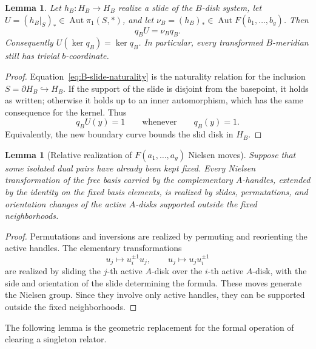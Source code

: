 \documentclass{article}
\newtheorem{lm}[theorem]{Lemma}
\DeclareMathOperator{\Aut}{Aut}
\begin{document}
\begin{lm}
\label{lem:B-slide-preserves-kernel}
Let \(h_B:H_B\to H_B\) realize a slide of the \(B\)-disk system, let
\(U=(h_B|_S)_*\in\Aut\pi_1(S,*)\), and let
\(\nu_B=(h_B)_*\in\Aut F(b_1,\ldots,b_g)\).  Then
\begin{equation}
 q_B U=\nu_B q_B.
 \label{eq:B-slide-naturality}
\end{equation}
Consequently \(U(\ker q_B)=\ker q_B\).  In particular, every transformed
\(B\)-meridian still has trivial \(b\)-coordinate.
\end{lm}

\begin{proof}
Equation~\eqref{eq:B-slide-naturality} is the naturality relation for the
inclusion \(S=\partial H_B\hookrightarrow H_B\).  If the support of the slide
is disjoint from the basepoint, it holds as written; otherwise it holds up to
an inner automorphism, which has the same consequence for the kernel.  Thus
\[
 q_B U(y)=1
 \qquad\text{whenever}\qquad q_B(y)=1.
\]
Equivalently, the new boundary curve bounds the slid disk in \(H_B\).
\end{proof}

\begin{lm}[Relative realization of $F(a_1,\ldots ,a_g)$  Nielsen moves]
\label{lem:relative-nielsen-realization}
Suppose that some isolated dual pairs have already been kept fixed.  Every
Nielsen transformation of the free basis carried by the complementary
\(A\)-handles, extended by the identity on the fixed basis elements, is
realized by slides, permutations, and orientation changes of the active
\(A\)-disks supported outside the fixed neighborhoods.
\end{lm}

\begin{proof}
Permutations and inversions are realized by permuting and reorienting the
active handles.  The elementary transformations
\[
 u_j\longmapsto u_i^{\pm1}u_j,
 \qquad
 u_j\longmapsto u_j u_i^{\pm1}
\]
are realized by sliding the \(j\)-th active \(A\)-disk over the \(i\)-th
active \(A\)-disk, with the side and orientation of the slide determining the
formula.  These moves generate the Nielsen group.  Since they involve only
active handles, they can be supported outside the fixed neighborhoods.
\end{proof}

The following lemma is the geometric replacement for the formal operation of
clearing a singleton relator.
\end{document}
